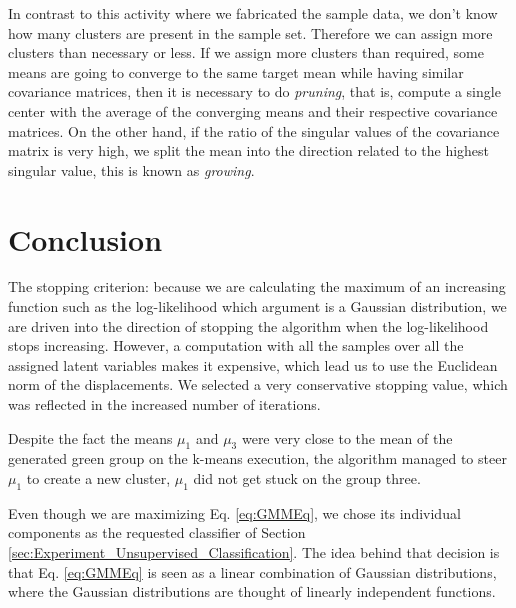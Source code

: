 \documentclass[letterpaper, 10 pt, conference]{ieeeconf}  %
\begin{document}
In contrast to this activity where we fabricated the sample data, we don't know how many clusters are present in the sample set. Therefore we can assign more clusters than necessary or less. If we assign more clusters than required, some means are going to converge to the same target mean while having similar covariance matrices, then it is necessary to do \emph{pruning}, that is, compute a single center with the average of the converging means and their respective covariance matrices. On the other hand, if the ratio of the singular values of the covariance matrix is very high, we split the mean into the direction related to the highest singular value, this is known as \emph{growing}.



\section{Conclusion}
\label{sec:Conclusion}

The stopping criterion: because we are calculating the maximum of an increasing function such as the log-likelihood which argument is a Gaussian distribution, we
are driven into the direction of stopping the algorithm when the log-likelihood stops increasing. However, a computation with all the samples over all the assigned
latent variables makes it expensive, which lead us to use the Euclidean norm of the displacements. We selected a very conservative stopping value, which was reflected in the increased number of iterations.

Despite the fact the means $\mu_{1}$ and $\mu_{3}$ were very close to the mean of the generated green group on the k-means execution, the algorithm managed
to steer $\mu_{1}$ to create a new cluster, $\mu_{1}$ did not get stuck on the group three.  

Even though we are maximizing Eq. \ref{eq:GMMEq}, we chose its individual components as the requested classifier of Section \ref{sec:Experiment_Unsupervised_Classification}. The idea behind that decision is that Eq. \ref{eq:GMMEq} is seen as a linear
combination of Gaussian distributions, where the Gaussian distributions are thought of linearly independent functions.


 









\end{document}
